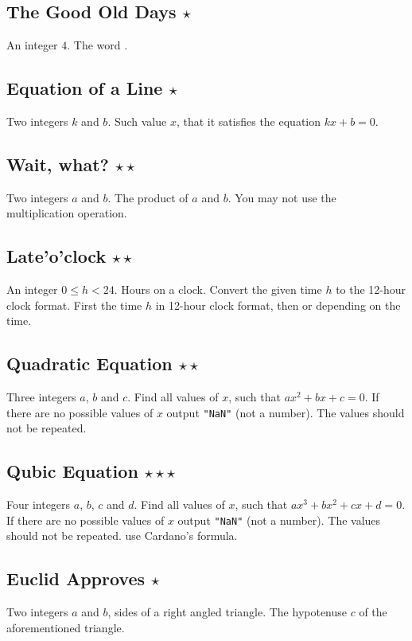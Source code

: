 \subsection{The Good Old Days $\star$}
\In
An integer $4$.
\Out
The word .

\subsection{Equation of a Line $\star$}
\In
Two integers $k$ and $b$.
\Out
Such value $x$, that it satisfies the equation $kx+b=0$. 

\subsection{Wait, what? $\star\star$}
\In
Two integers $a$ and $b$.
\Out
The product of $a$ and $b$.
\Note
You may not use the multiplication operation.

\subsection{Late'o'clock $\star\star$}
\In An integer $0 \leq h < 24$. Hours on a clock.
\Note Convert the given time $h$ to the 12-hour clock format.
\Out First the time $h$ in 12-hour clock format, then  or 
depending on the time.

\subsection{Quadratic Equation $\star\star$}
\In
Three integers $a$, $b$ and $c$.
\Out
Find all values of $x$, such that $ax^2 + bx + c=0$. 
\Note
If there are no possible values of $x$ output \texttt{"NaN"} (not a number). 
The values should not be repeated.

\subsection{Qubic Equation $\star\star\star$}
\In
Four integers $a$, $b$, $c$ and $d$.
\Out
Find all values of $x$, such that $ax^3 + bx^2 + cx + d = 0$. 
\Note
If there are no possible values of $x$ output \texttt{"NaN"} (not a number). 
The values should not be repeated.
\Hint
use Cardano's formula.

\subsection{Euclid Approves $\star$}
\In
Two integers $a$ and $b$, sides of a right angled triangle.
\Out
The hypotenuse $c$ of the aforementioned triangle.


